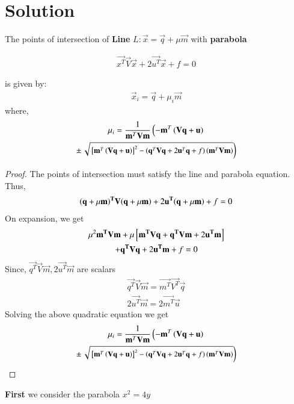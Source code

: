 \documentclass[journal,12pt,twocolumn]{IEEEtran}
\begin{document}
\section{Solution}
\begin{lemma}
The points of intersection of \textbf{Line} $L:\vec{x}=\vec{q}+\mu\vec{m}$ with \textbf{parabola}

\begin{align}
\vec{x^T}\vec{V}\vec{x}+2\vec{u^T}\vec{x}+f=0
\end{align}

is given by:
\begin{align}
\vec{x}_i = \vec{q}+\mu_i\vec{m}
\end{align}
%
where,
\begin{multline}
\mu_i = \frac{1}
{
\mathbf{m}^T\mathbf{V}\mathbf{m}
}
\left(-\mathbf{m}^T\left(\mathbf{V}\mathbf{q}+\mathbf{u}\right)\right.
\\
\pm
{\small
\ensuremath{\left.\sqrt{
{}\left[
\mathbf{m}^T\left(\mathbf{V}\mathbf{q}+\mathbf{u}\right)
\right]^2
-
\left(
\mathbf{q}^T\mathbf{V}\mathbf{q} + 2\mathbf{u}^T\mathbf{q} +f
\right)
\left(\mathbf{m}^T\mathbf{V}\mathbf{m}\right)
}
\right)}
}\label{quad}
\end{multline}
\end{lemma}
\begin{proof}
The points of intersection must satisfy the line and parabola equation.
Thus,
\begin{align}
\mathbf{\left(\mathbf{q}+\mu\mathbf{m}\right)^T}\mathbf{V}\mathbf{\left(\mathbf{q}+ \mu\mathbf{m}\right)}+2\mathbf{u^T}\mathbf{\left(\mathbf{q}+\mu\mathbf{m}\right)}+f=0
\end{align}
On expansion, we get
\begin{multline}
  \mu^2\mathbf{m^T}\mathbf{V}\mathbf{m}+ \mu{}\left[\mathbf{m^T}\mathbf{V}\mathbf{q}+\mathbf{q^T}\mathbf{V}\mathbf{m}+2\mathbf{u^T}\mathbf{m}\right]\\ + \mathbf{q^T}\mathbf{V}\mathbf{q}+2\mathbf{u^T}\mathbf{m}+f=0  
\end{multline}
Since, $\vec{q^T}\vec{V}\vec{m},2\vec{u^T}\vec{m}$ are scalars
\begin{align}
 \vec{q^T}\vec{V}\vec{m}=\vec{m^T}\vec{V^T}\vec{q} \\
 2\vec{u^T}\vec{m}=2\vec{m^T}\vec{u}
\end{align}
Solving the above quadratic equation we get
\begin{multline}
\mu_i = \frac{1}
{\mathbf{m}^T\mathbf{V}\mathbf{m}
}\left(-\mathbf{m}^T\left(\mathbf{V}\mathbf{q}+\mathbf{u}\right)\right.
\\\pm{\small
\ensuremath{\left.\sqrt{
{}\left[
\mathbf{m}^T\left(\mathbf{V}\mathbf{q}+\mathbf{u}\right)
\right]^2-\left(\mathbf{q}^T\mathbf{V}\mathbf{q} + 2\mathbf{u}^T\mathbf{q} +f
\right)\left(\mathbf{m}^T\mathbf{V}\mathbf{m}\right)
}\right)}}
\end{multline}
\end{proof}
\textbf{First} we consider the parabola $x^2 = 4y$
\end{document}
